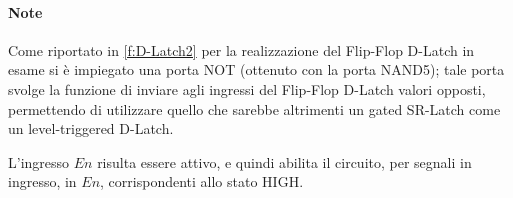	\paragraph{Note}
	Come riportato in \figurename{ \ref{f:D-Latch2}} per la realizzazione del Flip-Flop D-Latch in esame si è impiegato una porta NOT (ottenuto con la porta NAND5);
	tale porta svolge la funzione di inviare agli ingressi del Flip-Flop D-Latch valori opposti, permettendo di utilizzare quello che sarebbe altrimenti un gated SR-Latch come un level-triggered D-Latch.

	L'ingresso $En$ risulta essere attivo, e quindi abilita il circuito, per
	segnali in ingresso, in $En$, corrispondenti allo stato HIGH.


